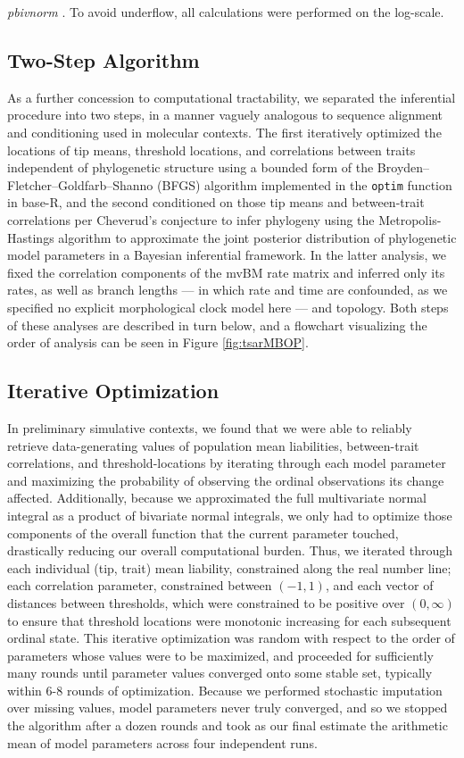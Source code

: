 \textit{pbivnorm} \citep{kenkelPackagePbivnorm2015}. To avoid underflow, all calculations were performed on the log-scale. 

\subsection{Two-Step Algorithm}

As a further concession to computational tractability, we separated the inferential procedure into two steps, in a manner vaguely analogous to sequence alignment and conditioning used in molecular contexts. The first iteratively optimized the locations of tip means, threshold locations, and correlations between traits independent of phylogenetic structure using a bounded form of the Broyden–Fletcher–Goldfarb–Shanno (BFGS) algorithm implemented in the \texttt{optim} function in base-R, and the second conditioned on those tip means and between-trait correlations per Cheverud's conjecture to infer phylogeny using the Metropolis-Hastings algorithm to approximate the joint posterior distribution of phylogenetic model parameters in a Bayesian inferential framework. In the latter analysis, we fixed the correlation components of the mvBM rate matrix and inferred only its rates, as well as branch lengths --- in which rate and time are confounded, as we specified no explicit morphological clock model here --- and topology. Both steps of these analyses are described in turn below, and a flowchart visualizing the order of analysis can be seen in Figure \ref{fig:tsarMBOP}.

\subsection{Iterative Optimization}

In preliminary simulative contexts, we found that we were able to reliably retrieve data-generating values of population mean liabilities, between-trait correlations, and threshold-locations by iterating through each model parameter and maximizing the probability of observing the ordinal observations its change affected. Additionally, because we approximated the full multivariate normal integral as a product of bivariate normal integrals, we only had to optimize those components of the overall function that the current parameter touched, drastically reducing our overall computational burden. Thus, we iterated through each individual (tip, trait) mean liability, constrained along the real number line; each correlation parameter, constrained between $(-1,1)$, and each vector of distances between thresholds, which were constrained to be positive over $(0, \infty)$ to ensure that threshold locations were monotonic increasing for each subsequent ordinal state. This iterative optimization was random with respect to the order of parameters whose values were to be maximized, and proceeded for sufficiently many rounds until parameter values converged onto some stable set, typically within 6-8 rounds of optimization. Because we performed stochastic imputation over missing values, model parameters never truly converged, and so we stopped the algorithm after a dozen rounds and took as our final estimate the arithmetic mean of model parameters across four independent runs. 

